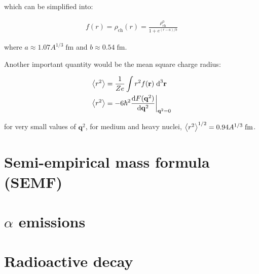 \documentclass[10pt]{article}
\theoremstyle{definition}
\begin{document}
which can be simplified into:

\begin{align}
    f(r) = \rho_{\text{ch}}(r) = \frac{\rho^0_{\text{ch}}}{1+e^{(r-a)/b}}
\end{align}

where $a\approx 1.07A^{1/3}\;\text{fm}$ and $b\approx 0.54\;\text{fm}$.\newline

Another important quantity would be the mean square charge radius:

\begin{align}
    \expval{r^2} &= \frac{1}{Ze} \int r^2 f(\mathbf{r})\;\text{d}^3\mathbf{r}\\
    \expval{r^2} &= -6\hbar^2\frac{\text{d}F(\mathbf{q}^2)}{\text{d}\mathbf{q}^2}\biggr|_{\mathbf{q}^2=0}
\end{align}

for very small values of $\mathbf{q}^2$, for medium and heavy nuclei, $\expval{r^2}^{1/2} = 0.94A^{1/3}\;\text{fm}$.



\section*{Semi-empirical mass formula (SEMF)}%


\section*{$\alpha$ emissions}%
\section*{Radioactive decay}%
\end{document}
